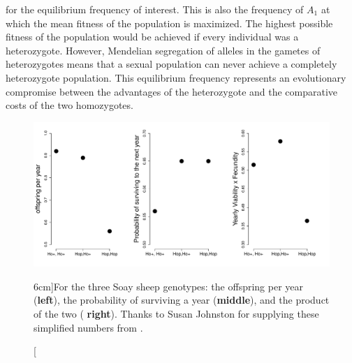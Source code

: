 for the equilibrium frequency of interest. This is also the frequency
of $A_1$ at which the mean fitness of the population is maximized. The
highest possible fitness of the population would be achieved if every
individual was a heterozygote. However, Mendelian segregation of alleles in the
gametes of heterozygotes means that a sexual population can never
achieve a completely heterozygote population. This equilibrium
frequency represents an evolutionary compromise between the advantages
of the heterozygote and the comparative costs of the two
homozygotes.\\



\begin{figure}
\begin{center}
  \includegraphics[width = \textwidth]{Rcode/Soay_Sheep/Hopping_sheep_all.pdf}
\end{center}
\caption[][6cm]{For the three Soay sheep genotypes: the offspring per year  ({\bf left}), the probability of
  surviving a year ({\bf middle}), and the product of the two ({\bf
    right}). Thanks to Susan Johnston for supplying these simplified
  numbers from \citet{johnston2013life}. 
} \label{fig:Soay_fitness}
\end{figure}


